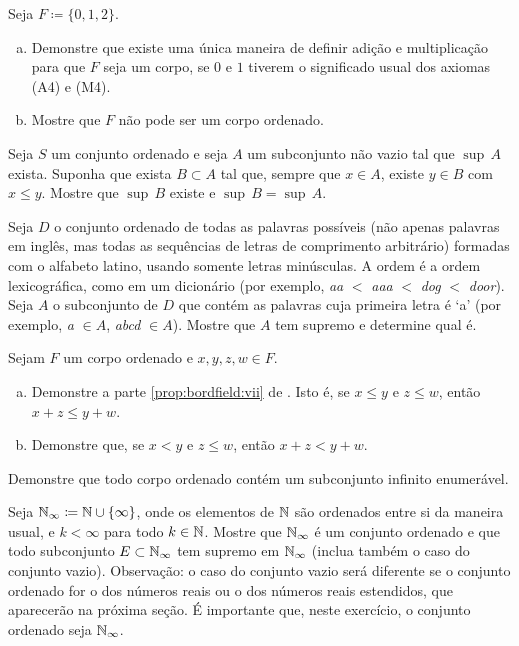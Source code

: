 \begin{exercise}
\pagebreak[2]
Seja $F \coloneqq \{ 0, 1, 2 \}$.
\begin{enumerate}[a)]
\item
Demonstre que existe uma única maneira de definir adição e multiplicação
para que $F$ seja um corpo, se $0$ e $1$ tiverem o significado usual dos
axiomas (A4) e (M4).
\item
Mostre que $F$ não pode ser um corpo ordenado.
\end{enumerate}
\end{exercise}

\begin{exercise} \label{exercise:dominatingb}
\pagebreak[2]
Seja $S$ um conjunto ordenado e
seja $A$ um subconjunto não vazio tal que $\sup \, A$ exista. Suponha que exista
$B \subset A$ tal que, sempre que $x \in A$, existe $y \in B$
com $x \leq y$. Mostre que $\sup \, B$ existe e $\sup \, B = \sup \, A$.
\end{exercise}

\begin{exercise}
Seja $D$ o conjunto ordenado de todas as palavras possíveis (não apenas palavras em inglês,
mas todas as sequências de letras de comprimento arbitrário)
formadas com o alfabeto latino, usando somente letras minúsculas. A ordem é a
ordem lexicográfica, como em um dicionário (por exemplo, \emph{aa} $<$ \emph{aaa} $<$ \emph{dog} $<$ \emph{door}).
Seja $A$ o subconjunto de $D$ que contém as palavras cuja
primeira letra é `a' (por exemplo, \emph{a} $\in A$, \emph{abcd} $\in A$).
Mostre que $A$ tem supremo e determine qual é.
\end{exercise}

\begin{exercise}
Sejam $F$ um corpo ordenado e $x,y,z,w \in F$.
\begin{enumerate}[a)]
\item
Demonstre a parte \ref{prop:bordfield:vii} de .
Isto é,
se $x \leq y$ e $z \leq w$, então $x+z \leq y+w$.
\item
Demonstre que,
se $x < y$ e $z \leq w$, então $x+z < y+w$.
\end{enumerate}
\end{exercise}

\begin{exercise}
Demonstre que todo corpo ordenado contém um subconjunto infinito enumerável.
\end{exercise}

\begin{exercise}
Seja ${\mathbb{N}}_{\infty} \coloneqq {\mathbb{N}} \cup \{ \infty \}$, onde os elementos de ${\mathbb{N}}$ são
ordenados entre si da maneira usual,
e $k < \infty$ para todo $k \in {\mathbb{N}}$. Mostre que ${\mathbb{N}}_{\infty}$ é um conjunto ordenado
e que todo subconjunto $E \subset {\mathbb{N}}_{\infty}$ tem supremo em
${\mathbb{N}}_{\infty}$ (inclua também o caso do conjunto vazio).
Observação: o caso do conjunto vazio será diferente
se o conjunto ordenado for o dos números reais ou o dos números reais
estendidos, que aparecerão na próxima seção. É importante que, neste exercício,
o conjunto ordenado seja ${\mathbb{N}}_{\infty}$.
\end{exercise}

